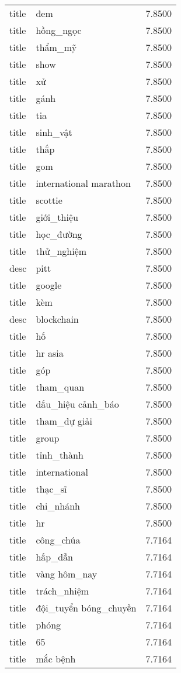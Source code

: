 \documentclass{article}
\begin{document}
\begin{tabular}{lll}
title & đem & 7.8500\\
title & hồng\_ngọc & 7.8500\\
title & thẩm\_mỹ & 7.8500\\
title & show & 7.8500\\
title & xử & 7.8500\\
title & gánh & 7.8500\\
title & tia & 7.8500\\
title & sinh\_vật & 7.8500\\
title & thắp & 7.8500\\
title & gom & 7.8500\\
title & international marathon & 7.8500\\
title & scottie & 7.8500\\
title & giới\_thiệu & 7.8500\\
title & học\_đường & 7.8500\\
title & thử\_nghiệm & 7.8500\\
desc & pitt & 7.8500\\
title & google & 7.8500\\
title & kèm & 7.8500\\
desc & blockchain & 7.8500\\
title & hố & 7.8500\\
title & hr asia & 7.8500\\
title & góp & 7.8500\\
title & tham\_quan & 7.8500\\
title & dấu\_hiệu cảnh\_báo & 7.8500\\
title & tham\_dự giải & 7.8500\\
title & group & 7.8500\\
title & tỉnh\_thành & 7.8500\\
title & international & 7.8500\\
title & thạc\_sĩ & 7.8500\\
title & chi\_nhánh & 7.8500\\
title & hr & 7.8500\\
title & công\_chúa & 7.7164\\
title & hấp\_dẫn & 7.7164\\
title & vàng hôm\_nay & 7.7164\\
title & trách\_nhiệm & 7.7164\\
title & đội\_tuyển bóng\_chuyền & 7.7164\\
title & phóng & 7.7164\\
title & 65 & 7.7164\\
title & mắc bệnh & 7.7164\\

\end{tabular}
\end{document}
